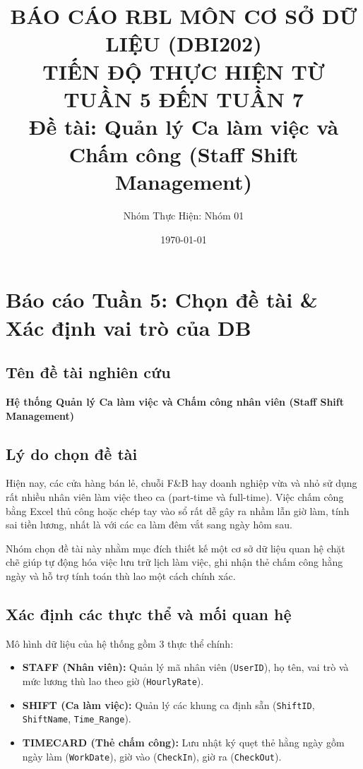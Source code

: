 \documentclass[12pt,a4paper]{article}
\title{\textbf{BÁO CÁO RBL MÔN CƠ SỞ DỮ LIỆU (DBI202)}\\
\large TIẾN ĐỘ THỰC HIỆN TỪ TUẦN 5 ĐẾN TUẦN 7\\
\small Đề tài: Quản lý Ca làm việc và Chấm công (Staff Shift Management)}
\author{Nhóm Thực Hiện: Nhóm 01}
\date{\today}
\begin{document}
\maketitle

\tableofcontents
\newpage

\section{Báo cáo Tuần 5: Chọn đề tài \& Xác định vai trò của DB}

\subsection{Tên đề tài nghiên cứu}
\textbf{Hệ thống Quản lý Ca làm việc và Chấm công nhân viên (Staff Shift Management)}

\subsection{Lý do chọn đề tài}
Hiện nay, các cửa hàng bán lẻ, chuỗi F\&B hay doanh nghiệp vừa và nhỏ sử dụng rất nhiều nhân viên làm việc theo ca (part-time và full-time). Việc chấm công bằng Excel thủ công hoặc chép tay vào sổ rất dễ gây ra nhầm lẫn giờ làm, tính sai tiền lương, nhất là với các ca làm đêm vắt sang ngày hôm sau.

Nhóm chọn đề tài này nhằm mục đích thiết kế một cơ sở dữ liệu quan hệ chặt chẽ giúp tự động hóa việc lưu trữ lịch làm việc, ghi nhận thẻ chấm công hằng ngày và hỗ trợ tính toán thù lao một cách chính xác.

\subsection{Xác định các thực thể và mối quan hệ}
Mô hình dữ liệu của hệ thống gồm 3 thực thể chính:
\begin{itemize}
    \item \textbf{STAFF (Nhân viên):} Quản lý mã nhân viên (\texttt{UserID}), họ tên, vai trò và mức lương thù lao theo giờ (\texttt{HourlyRate}).
    \item \textbf{SHIFT (Ca làm việc):} Quản lý các khung ca định sẵn (\texttt{ShiftID}, \texttt{ShiftName}, \texttt{Time\_Range}).
    \item \textbf{TIMECARD (Thẻ chấm công):} Lưu nhật ký quẹt thẻ hằng ngày gồm ngày làm (\texttt{WorkDate}), giờ vào (\texttt{CheckIn}), giờ ra (\texttt{CheckOut}).
\end{itemize}
\end{document}

